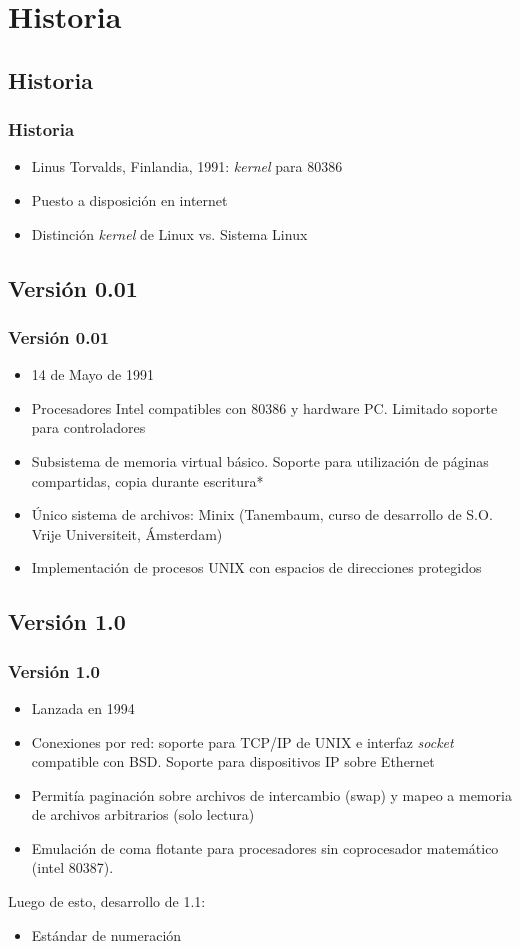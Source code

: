 \documentclass[spanish]{beamer}
\begin{document}
  \section{Historia}
	\subsection{Historia}
  \frame
  {
    \frametitle{Historia}
    \begin{itemize}
    	\item Linus Torvalds, Finlandia, 1991: \textit{kernel} para 80386
    	\item Puesto a disposición en internet
    	\item Distinción \textit{kernel} de Linux vs. Sistema Linux
    \end{itemize}
  }

\subsection{Versi\'{o}n 0.01}
  \frame
  {
    \frametitle{Versi\'{o}n 0.01}
    \begin{itemize}
    	\item 14 de Mayo de 1991
    	\item Procesadores Intel compatibles con 80386 y hardware PC. Limitado soporte para controladores
    	\item Subsistema de memoria virtual básico. Soporte para utilización de páginas compartidas, copia durante escritura*
    	\item \'{U}nico sistema de archivos: Minix (Tanembaum, curso de desarrollo de S.O. Vrije Universiteit, Ámsterdam)
    	\item Implementación de procesos UNIX con espacios de direcciones protegidos
    \end{itemize}
  }
  
\subsection{Versi\'{o}n 1.0}
  \frame
  {
    \frametitle{Versi\'{o}n 1.0}
    \begin{itemize}
    	\item Lanzada en 1994
    	\item Conexiones por red: soporte para TCP/IP de UNIX e interfaz \textit{socket} compatible con BSD. Soporte para dispositivos IP sobre Ethernet
    	\item Permitía paginación sobre archivos de intercambio (swap) y mapeo a memoria de archivos arbitrarios (solo lectura)
    	\item Emulación de coma flotante para procesadores sin coprocesador matem\'{a}tico (intel 80387).
    \end{itemize}
    Luego de esto, desarrollo de 1.1:
    \begin{itemize}
    	\item Est\'{a}ndar de numeraci\'{o}n
    \end{itemize}
  }  
  
\end{document}
